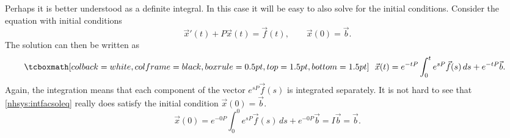 Perhaps it is better understood as a definite integral.  In this case
it will be easy to also solve for the initial conditions.
Consider the
equation with initial conditions
\begin{equation*}
{\vec{x}}'(t) + P\vec{x}(t) = \vec{f}(t) ,
\qquad \vec{x}(0) = \vec{b} .
\end{equation*}
The solution can then be written as
\begin{equation} \label{nhsys:intfacsoleq}
\mybxbg{~~
\vec{x}(t) = e^{-tP} \int_0^t e^{sP}\vec{f}(s) \, ds + e^{-tP} \vec{b} .
~~}
\end{equation}
Again, the integration means that each component of the vector 
$e^{sP}\vec{f}(s)$ is integrated separately.
It is not hard to see that \eqref{nhsys:intfacsoleq} really does satisfy the
initial condition $\vec{x}(0) = \vec{b}$.
\begin{equation*}
\vec{x}(0) = e^{-0P} \int_0^0 e^{sP}\vec{f}(s) \, ds + e^{-0P} \vec{b}
= I \vec{b} = \vec{b} .
\end{equation*}

